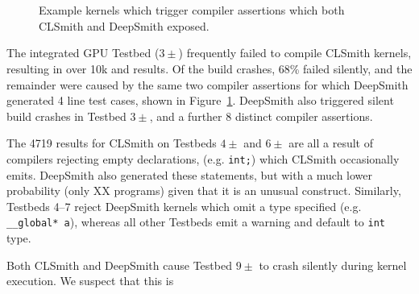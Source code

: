 \begin{figure}
  \centering %
  \\%
  \subfloat[Assertion \emph{iter != pointerOrigMap.end()}.]{%
    \noindent\mbox{\parbox{\columnwidth}{\usebox{\BeigIterAssertion}}}%
    \label{lst:beig-iter-assertion}
  }\\%
  \caption{Example kernels which trigger compiler assertions which both CLSmith and DeepSmith exposed.}%
  \label{lst:beig-assertions}
\end{figure}

The integrated GPU Testbed ($3\pm$) frequently failed to compile CLSmith kernels, resulting in over 10k \bc and \bto results.
Of the build crashes, 68\% failed silently, and the remainder were caused by the same two compiler assertions for which DeepSmith generated 4 line test cases, shown in Figure~\ref{lst:beig-assertions}. DeepSmith also triggered silent build crashes in Testbed $3\pm$, and a further 8 distinct compiler assertions.

The 4719 \abf results for CLSmith on Testbeds $4\pm$ and $6\pm$ are all a result of compilers rejecting empty declarations, (e.g. \texttt{int;}) which CLSmith occasionally emits. DeepSmith also generated these statements, but with a much lower probability (only XX programs) given that it is an unusual construct.
Similarly, Testbeds 4--7 reject DeepSmith kernels which omit a type specified (e.g. \texttt{\_\_global* a}), whereas all other Testbeds emit a warning and default to \texttt{int} type.


 Both CLSmith and DeepSmith cause Testbed $9\pm$ to crash silently during kernel execution. We suspect that this is 

